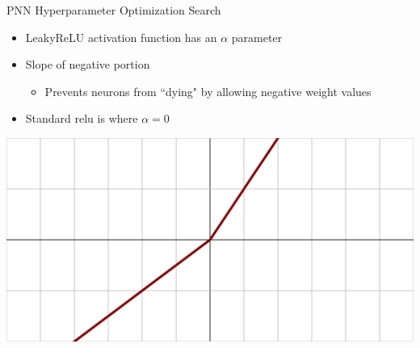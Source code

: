 \documentclass[aspectratio=169,xcolor=table]{beamer}
\begin{document}
    \begin{frame}[t]{PNN Hyperparameter Optimization Search}
      \begin{itemize}
        \item LeakyReLU activation function has an $\alpha$ parameter
        \item Slope of negative portion
        \begin{itemize}
          \item Prevents neurons from ``dying" by allowing negative weight values
        \end{itemize}
        \item Standard relu is where $\alpha=0$
      \end{itemize}
      \centering
      \includegraphics[height=.4\textheight,keepaspectratio=true]{Activation_prelu.svg.png}
    \end{frame}
\end{document}
